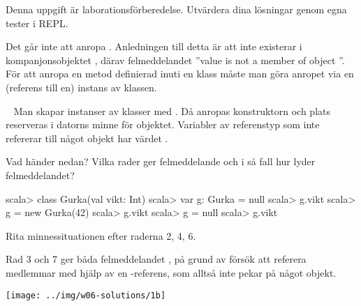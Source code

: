 \SOLUTION


\TaskSolved \what Denna uppgift är laborationsförberedelse. Utvärdera dina lösningar genom egna tester i REPL.

\SubtaskSolved Det går inte att anropa . Anledningen till detta är att  inte existerar i kompanjonsobjektet , därav felmeddelandet ''value  is not a member of object ''. För att anropa en metod definierad inuti en klass måste man göra anropet via en (referens till en) instans av klassen.

\QUESTEND






\ExtraTasks %



\QUESTBEGIN

\Task  \what~  Man skapar instanser av klasser med . Då anropas konstruktorn och plats reserveras i datorns minne för objektet. Variabler av referenstyp som inte refererar till något objekt har värdet .

\Subtask Vad händer nedan? Vilka rader ger felmeddelande och i så fall hur lyder felmeddelandet?

\begin{REPL}
scala> class Gurka(val vikt: Int)
scala> var g: Gurka = null
scala> g.vikt
scala> g = new Gurka(42)
scala> g.vikt
scala> g = null
scala> g.vikt
\end{REPL}

\Subtask Rita minnessituationen efter raderna 2, 4, 6.

\SOLUTION


\TaskSolved \what


\SubtaskSolved  Rad 3 och 7 ger båda felmeddelandet ,  på grund av försök att referera medlemmar med hjälp av en -referens, som alltså inte pekar på något objekt.

\SubtaskSolved  \texttt{[image: ../img/w06-solutions/1b]}


\QUESTEND




\QUESTBEGIN

